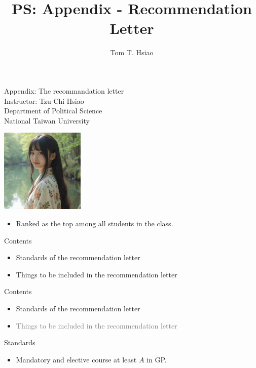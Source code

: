 \documentclass{beamer}
\title{PS: Appendix - Recommendation Letter}
\author{Tom T. Hsiao}
\date{}
\begin{document}
\begin{frame}
\begin{center}
\Large{Appendix: The recommandation letter} \\
\vspace{3em}
\normalsize{Instructor: Tzu-Chi Hsiao} \\
\vspace{3em}
\small{Department of Political Science} \\
\vspace{1em}
\small{National Taiwan University} \\
\end{center}
\end{frame}
\begin{frame}{}
\begin{center}
\includegraphics[width=0.3\textwidth]{letter.png} \\
\end{center}
\begin{itemize}
\item Ranked as the top among all students in the class.
\end{itemize}
\end{frame}
\begin{frame}{Contents}
\begin{itemize}
\item Standards of the recommendation letter
\item Things to be included in the recommendation letter
\end{itemize}
\end{frame}
\begin{frame}{Contents}
\begin{itemize}
\item Standards of the recommendation letter
\item \textcolor{gray}{Things to be included in the recommendation letter}
\end{itemize}
\end{frame}
\begin{frame}{Standards}
\begin{itemize}
\item Mandatory and elective course at least $A$ in GP.
\end{itemize}
\end{frame}
\end{document}
